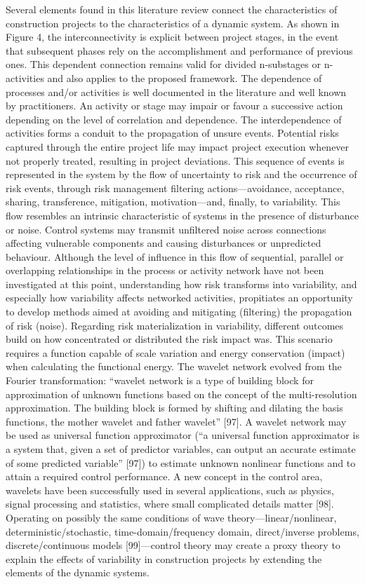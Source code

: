 \documentclass{article}
\begin{document}
Several elements found in this literature review connect the characteristics of construction projects to the characteristics of a dynamic system.
As shown in Figure 4, the interconnectivity is explicit between project stages, in the event that subsequent phases rely on the accomplishment and performance of previous ones.
This dependent connection remains valid for divided n-substages or n-activities and also applies to the proposed framework.
The dependence of processes and/or activities is well documented in the literature and well known by practitioners.
An activity or stage may impair or favour a successive action depending on the level of correlation and dependence.
The interdependence of activities forms a conduit to the propagation of unsure events. Potential risks captured through the entire project life may impact project execution whenever not properly treated, resulting in project deviations.
This sequence of events is represented in the system by the flow of uncertainty to risk and the occurrence of risk events, through risk management filtering actions—avoidance, acceptance, sharing, transference, mitigation, motivation—and, finally, to variability.
This flow resembles an intrinsic characteristic of systems in the presence of disturbance or noise.
Control systems may transmit unfiltered noise across connections affecting vulnerable components and causing disturbances or unpredicted behaviour.
Although the level of influence in this flow of sequential, parallel or overlapping relationships in the process or activity network have not been investigated at this point, understanding how risk transforms into variability, and especially how variability affects networked activities, propitiates an opportunity to develop methods aimed at avoiding and mitigating (filtering) the propagation of risk (noise). Regarding risk materialization in variability, different outcomes build on how concentrated or distributed the risk impact was.
This scenario requires a function capable of scale variation and energy conservation (impact) when calculating the functional energy.
The wavelet network evolved from the Fourier transformation: “wavelet network is a type of building block for approximation of unknown functions based on the concept of the multi-resolution approximation.
The building block is formed by shifting and dilating the basis functions, the mother wavelet and father wavelet” [97].
A wavelet network may be used as universal function approximator (“a universal function approximator is a system that, given a set of predictor variables, can output an accurate estimate of some predicted variable” [97]) to estimate unknown nonlinear functions and to attain a required control performance.
A new concept in the control area, wavelets have been successfully used in several applications, such as physics, signal processing and statistics, where small complicated details matter [98].
Operating on possibly the same conditions of wave theory—linear/nonlinear, deterministic/stochastic, time-domain/frequency domain, direct/inverse problems, discrete/continuous models [99]—control theory may create a proxy theory to explain the effects of variability in construction projects by extending the elements of the dynamic systems.
\end{document}
